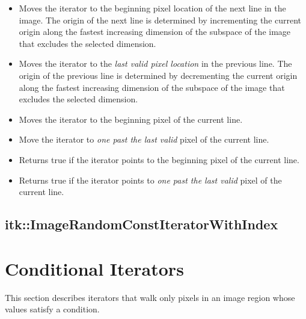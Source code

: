 \begin{itemize}
\item \textbf{} Moves the iterator to the beginning pixel
location of the next line in the image.  The origin of the next line is
determined by incrementing the current origin along the fastest increasing
dimension of the subspace of the image that excludes the selected dimension.

\item \textbf{} Moves the iterator to the \emph{last valid
pixel location} in the previous line. The origin of the previous line is
determined by decrementing the current origin along the fastest increasing
dimension of the subspace of the image that excludes the selected dimension.

\item \textbf{} Moves the iterator to the beginning
pixel of the current line.

\item \textbf{}  Move the iterator to \emph{one past
the last valid} pixel of the current line.

\item \textbf{} Returns true if the iterator points
to the beginning pixel of the current line.

\item \textbf{}  Returns true if the iterator points to
\emph{one past the last valid} pixel of the current line.
\end{itemize}




\subsection{itk::ImageRandomConstIteratorWithIndex}
\label{sec:itkImageRandomConstIteratorWithIndex}


\section{Conditional Iterators}
\label{sec:ConditionalIterators}
This section describes iterators that walk only pixels in an image region whose
values satisfy a condition.





